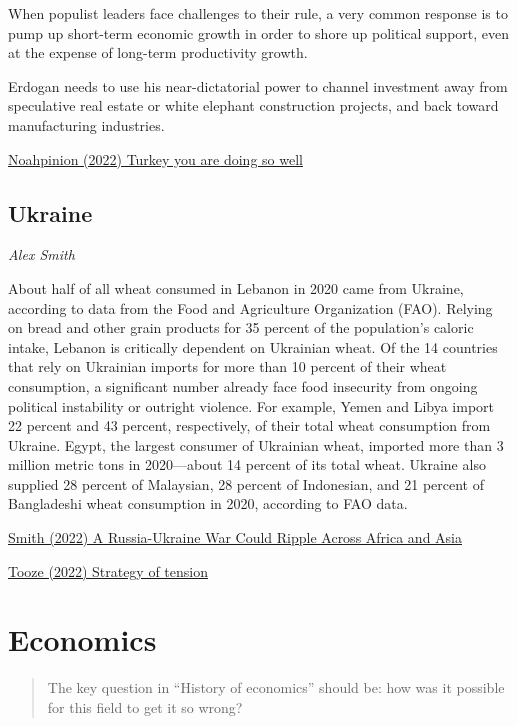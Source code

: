 \documentclass[
]{book}
\begin{document}
When populist leaders face challenges to their rule, a very common response is to pump up short-term economic growth in order to shore up political support, even at the expense of long-term productivity growth.

Erdogan needs to use his near-dictatorial power to channel investment away from speculative real estate or white elephant construction projects, and back toward manufacturing industries.

\href{https://noahpinion.substack.com/p/turkey-you-were-doing-so-well}{Noahpinion (2022) Turkey you are doing so well}

\hypertarget{ukraine}{%
\section{Ukraine}\label{ukraine}}

\emph{Alex Smith}

About half of all wheat consumed in Lebanon in 2020 came from Ukraine, according to data from the Food and Agriculture Organization (FAO). Relying on bread and other grain products for 35 percent of the population's caloric intake, Lebanon is critically dependent on Ukrainian wheat. Of the 14 countries that rely on Ukrainian imports for more than 10 percent of their wheat consumption, a significant number already face food insecurity from ongoing political instability or outright violence. For example, Yemen and Libya import 22 percent and 43 percent, respectively, of their total wheat consumption from Ukraine. Egypt, the largest consumer of Ukrainian wheat, imported more than 3 million metric tons in 2020---about 14 percent of its total wheat. Ukraine also supplied 28 percent of Malaysian, 28 percent of Indonesian, and 21 percent of Bangladeshi wheat consumption in 2020, according to FAO data.

\href{https://foreignpolicy.com/2022/01/22/russia-ukraine-war-grain-exports-africa-asia/}{Smith (2022) A Russia-Ukraine War Could Ripple Across Africa and Asia}

\href{https://adamtooze.substack.com/p/chartbook-76-strategy-of-tension}{Tooze (2022) Strategy of tension}

\hypertarget{economics-1}{%
\chapter{Economics}\label{economics-1}}

\begin{quote}
The key question in ``History of economics'' should be: how was it possible for this field to get it so wrong?
\end{quote}
\end{document}
